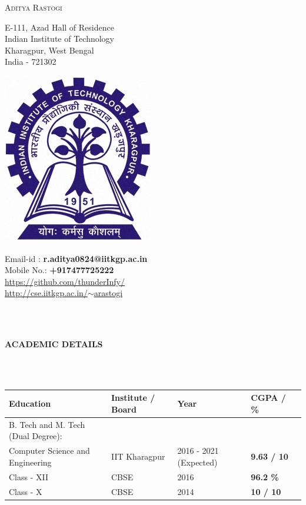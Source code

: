 \documentclass[letter,10pt]{book}
\newcommand{\lsep}{-0.5cm}
\newcommand{\resheading}[1]{{\small \colorbox{mygrey}{\begin{minipage}{0.975\textwidth}{\textbf{#1 \vphantom{p\^{E}}}}\end{minipage}}}}
\begin{document}
\begin{center}
\textsc{\Huge Aditya Rastogi}
\end{center}

\begin{minipage}{0.30\textwidth}
{\raggedleft
E-111, Azad Hall of Residence\\
Indian Institute of Technology\\
Kharagpur, West Bengal\\
India - 721302\\
}
\end{minipage}%
\begin{minipage}{0.33\textwidth}
\begin{center}
\includegraphics[width=0.30\linewidth]{logo.jpg}
\end{center}
\end{minipage}%
\begin{minipage}{0.33\textwidth}
{\raggedright
Email-id : \textbf{r.aditya0824@iitkgp.ac.in} \\
Mobile No.: \textbf{+917477725222} \\
\href{https://github.com/thunderInfy/}{https://github.com/thunderInfy/} \\
\href{http://cse.iitkgp.ac.in/~arastogi}{http://cse.iitkgp.ac.in/$\sim$arastogi}\\
}
\end{minipage}%
\hspace{0.5cm}\\
\\
\resheading{\textbf{ACADEMIC DETAILS} }\\[\lsep]
\\
\begin{center}
\renewcommand{\arraystretch}{1.5}
\indent \begin{tabular}{ |@{\hskip 0.125in}l @{\hskip 0.125in} |@{\hskip 0.125in}l @{\hskip 0.125in} |@{\hskip 0.125in}l @{\hskip 0.125in} |@{\hskip 0.125in}l @{\hskip 0.25in} |l }
\hline
\textbf{Education} & \textbf{Institute / Board} & \textbf{Year} & \textbf{CGPA / \%} \\
\hline
B. Tech and M. Tech (Dual Degree): &&&\\[-0.5em]
{Computer Science and Engineering} & IIT Kharagpur  & 2016 - 2021 (Expected) & \textbf{9.63 / 10} \\
\hline
Class - XII & CBSE & 2016 & \textbf{96.2 \%}\\
\hline
Class - X & CBSE & 2014 & \textbf{10 / 10}\\
\hline
\end{tabular}
\end{center}
\end{document}
